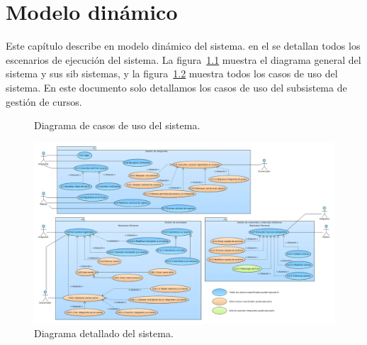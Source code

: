 \chapter{Modelo dinámico}	
\label{cap:modDinamico}

	Este capítulo describe en modelo dinámico del sistema. en el se detallan todos los escenarios de ejecución del sistema. La figura~\ref{fig:casosDeUso} muestra el diagrama general del sistema y sus sib sistemas, y la figura~\ref{fig:casosDeUsoDetalle} muestra todos los casos de uso del sistema. En este documento solo detallamos los casos de uso del subsistema de gestión de cursos.
	
\begin{figure}[htbp]
	\begin{center}
		\caption{Diagrama de casos de uso del sistema.}
		\label{fig:casosDeUso}
	\end{center}
\end{figure}

\begin{figure}[htbp]
	\begin{center}
		\includegraphics[angle=90, width=.7\textwidth]{images/casosDeUsoDetalle}
		\caption{Diagrama detallado del sistema.}
		\label{fig:casosDeUsoDetalle}
	\end{center}
\end{figure}

